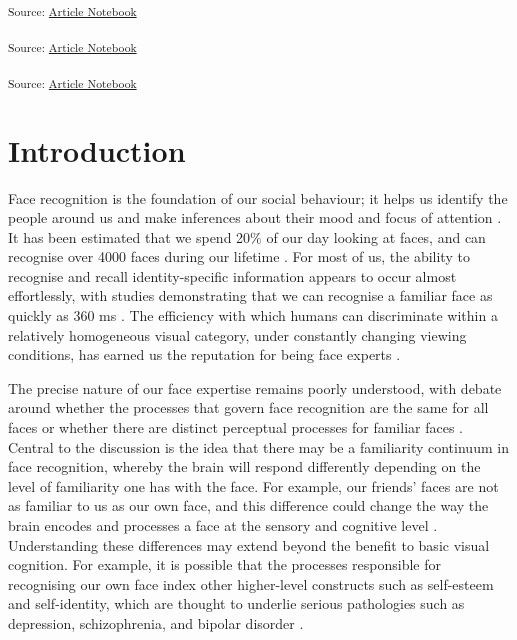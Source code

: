 \documentclass[
  authoryear,
  review,
  3p,
  onecolumn]{elsarticle}
\begin{document}
\textsubscript{Source:
\href{https://deborahapthorp.github.io/SelfFaceManuscript/index.qmd.html}{Article
Notebook}}

\textsubscript{Source:
\href{https://deborahapthorp.github.io/SelfFaceManuscript/index.qmd.html}{Article
Notebook}}

\textsubscript{Source:
\href{https://deborahapthorp.github.io/SelfFaceManuscript/index.qmd.html}{Article
Notebook}}

\section{Introduction}\label{introduction}

Face recognition is the foundation of our social behaviour; it helps us
identify the people around us and make inferences about their mood and
focus of attention \citep{burton2015a, mohr2018a}. It has been estimated
that we spend 20\(\%\) of our day looking at faces, and can recognise
over 4000 faces during our lifetime \citep{jenkins2018a, oruc2019a}. For
most of us, the ability to recognise and recall identity-specific
information appears to occur almost effortlessly, with studies
demonstrating that we can recognise a familiar face as quickly as 360 ms
\citep{besson2016a, blauch2021a, oruc2019a, ramon2016a}. The efficiency
with which humans can discriminate within a relatively homogeneous
visual category, under constantly changing viewing conditions, has
earned us the reputation for being face experts
\citep{collins2018a, dobs2019a, kramer2017a, quek2021a, rossion_what_2019, towler_are_2019}.

The precise nature of our face expertise remains poorly understood, with
debate around whether the processes that govern face recognition are the
same for all faces or whether there are distinct perceptual processes
for familiar faces \citep{abudarham2019a, blauch2021a, collins2018a}.
Central to the discussion is the idea that there may be a familiarity
continuum in face recognition, whereby the brain will respond
differently depending on the level of familiarity one has with the face.
For example, our friends' faces are not as familiar to us as our own
face, and this difference could change the way the brain encodes and
processes a face at the sensory and cognitive level
\citep{bortolon2018a, rooney2012a, tong1999a}. Understanding these
differences may extend beyond the benefit to basic visual cognition. For
example, it is possible that the processes responsible for recognising
our own face index other higher-level constructs such as self-esteem and
self-identity, which are thought to underlie serious pathologies such as
depression, schizophrenia, and bipolar disorder
\citep{felisberti2014a, oliveira2015a}.
\end{document}
